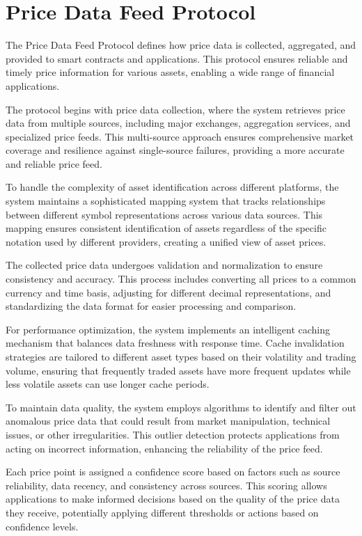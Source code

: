 \documentclass[11pt]{article}
\begin{document}
\section{Price Data Feed Protocol}
\label{subsec:price-feed-protocol-spec}

The Price Data Feed Protocol defines how price data is collected, aggregated, and provided to smart contracts and applications. This protocol ensures reliable and timely price information for various assets, enabling a wide range of financial applications.


The protocol begins with price data collection, where the system retrieves price data from multiple sources, including major exchanges, aggregation services, and specialized price feeds. This multi-source approach ensures comprehensive market coverage and resilience against single-source failures, providing a more accurate and reliable price feed.

To handle the complexity of asset identification across different platforms, the system maintains a sophisticated mapping system that tracks relationships between different symbol representations across various data sources. This mapping ensures consistent identification of assets regardless of the specific notation used by different providers, creating a unified view of asset prices.

The collected price data undergoes validation and normalization to ensure consistency and accuracy. This process includes converting all prices to a common currency and time basis, adjusting for different decimal representations, and standardizing the data format for easier processing and comparison.

For performance optimization, the system implements an intelligent caching mechanism that balances data freshness with response time. Cache invalidation strategies are tailored to different asset types based on their volatility and trading volume, ensuring that frequently traded assets have more frequent updates while less volatile assets can use longer cache periods.

To maintain data quality, the system employs algorithms to identify and filter out anomalous price data that could result from market manipulation, technical issues, or other irregularities. This outlier detection protects applications from acting on incorrect information, enhancing the reliability of the price feed.

Each price point is assigned a confidence score based on factors such as source reliability, data recency, and consistency across sources. This scoring allows applications to make informed decisions based on the quality of the price data they receive, potentially applying different thresholds or actions based on confidence levels.
\end{document}
